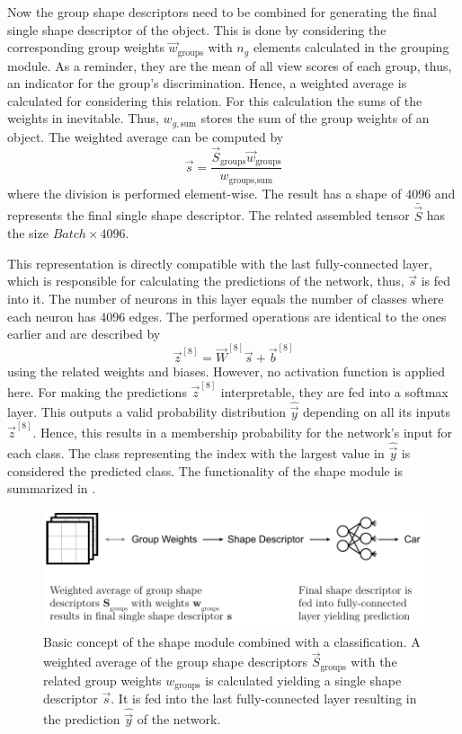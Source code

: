Now the group shape descriptors need to be combined for generating the final single shape descriptor of the object.
This is done by considering the corresponding group weights $\vec{w}_{\text{groups}}$ with $n_g$ elements calculated in the grouping module.
As a reminder, they are the mean of all view scores of each group, thus, an indicator for the group's discrimination.
Hence, a weighted average is calculated for considering this relation.
For this calculation the sums of the weights in inevitable.
Thus, $w_{g,\text{sum}}$ stores the sum of the group weights of an object.
The weighted average can be computed by
\begin{equation}
	\vec{s} = \frac{\vec{S}_{\text{groups}} \vec{w}_{\text{groups}}} {w_{\text{groups},\text{sum}}}
\end{equation}
where the division is performed element-wise.
The result has a shape of $4096$ and represents the final single shape descriptor.
The related assembled tensor $\bar{\vec{S}}$ has the size $Batch \times 4096$.

This representation is directly compatible with the last fully-connected layer, which is responsible for calculating the predictions of the network, thus, $\vec{s}$ is fed into it.
The number of neurons in this layer equals the number of classes where each neuron has 4096 edges.
The performed operations are identical to the ones earlier and are described by
\begin{equation}
	\vec{z}^{[8]} = \vec{W}^{[8]} \vec{s} + \vec{b}^{[8]}
\end{equation}
using the related weights and biases.
However, no activation function is applied here.
For making the predictions $\vec{z}^{[8]}$ interpretable, they are fed into a softmax layer.
This outputs a valid probability distribution $\hat{\vec{y}}$ depending on all its inputs $\vec{z}^{[8]}$.
Hence, this results in a membership probability for the network's input for each class.
The class representing the index with the largest value in $\hat{\vec{y}}$ is considered the predicted class. The functionality of the shape module is summarized in .
\begin{figure}
	\centering
	\includegraphics[]{images/shape_module_final_shape.pdf}
	\caption[Basic concept of the shape module]{Basic concept of the shape module combined with a classification. A weighted average of the group shape descriptors $\vec{S}_{\text{groups}}$ with the related group weights $w_{\text{groups}}$ is calculated yielding a single shape descriptor $\vec{s}$. It is fed into the last fully-connected layer resulting in the prediction $\hat{\vec{y}}$ of the network.}
	\label{fig:shape-module-final-shape}
\end{figure}
